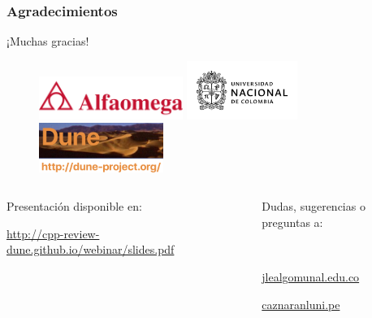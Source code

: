 \begin{frame}
	\frametitle{Agradecimientos}
	\begin{center}\LARGE
		¡Muchas gracias!
	\end{center}
	\begin{figure}[ht!]
		\centering
		\includegraphics[height=1.4cm]{alfaomega}\quad
		\includegraphics[height=1.9cm]{unal}\quad
		\includegraphics[height=1.6cm]{dune-logo}
	\end{figure}
	\vfill
	\begin{columns}
		\begin{column}{0.5\textwidth}
			\textcolor{c++reviewduneblue}{Presentación disponible en:}
			\begin{center}
				\href{http://cpp-review-dune.github.io/webinar/slides.pdf}{\url{http://cpp-review-dune.github.io/webinar/slides.pdf}}
			\end{center}
		\end{column}
		\hfill
		\begin{column}{0.5\textwidth}
			\begin{flushright}
				Dudas, sugerencias o preguntas a:

				\

				\href{mailto:jlealgom@unal.edu.co}{jlealgom\MVAt unal.edu.co}

				\href{mailto:caznaranl@uni.pe}{caznaranl\MVAt uni.pe}
			\end{flushright}
		\end{column}
	\end{columns}

\end{frame}